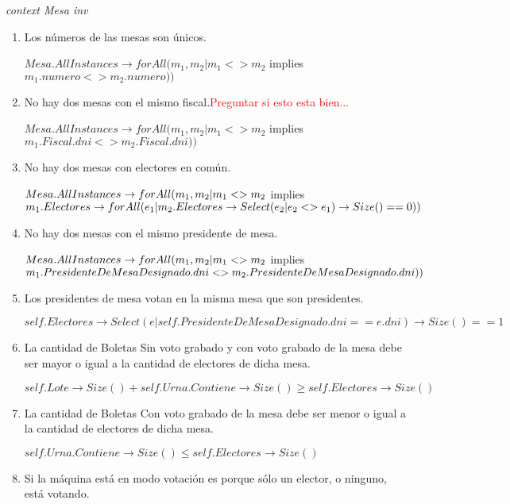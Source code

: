 \textit{context Mesa
inv}
\begin{enumerate}

\item Los n\'umeros de las mesas son únicos.

$Mesa.AllInstances \rightarrow forAll(m_1, m_2 | m_1<>m_2$ implies $m_1.numero <> m_2.numero))$

\item  No hay dos mesas con el mismo fiscal.\textcolor{red}{Preguntar si esto esta bien...}

$Mesa.AllInstances \rightarrow forAll(m_1, m_2 | m_1<>m_2$ implies $m_1.Fiscal.dni <> m_2.Fiscal.dni))$

\item No hay dos mesas con electores en común.

$Mesa.AllInstances \rightarrow \\
 forAll(m_1, m_2 | m_1<>m_2$ implies $m_1.Electores \rightarrow \\
 	forAll(e_1 | m_2.Electores \rightarrow Select(e_2 | e_2 <> e_1) \rightarrow Size() == 0))$

\item No hay dos mesas con el mismo presidente de mesa.

$Mesa.AllInstances \rightarrow \\
forAll(m_1, m_2 | m_1<>m_2$ implies $ \\ m_1.PresidenteDeMesaDesignado.dni <> m_2.PresidenteDeMesaDesignado.dni))$

\item Los presidentes de mesa votan en la misma mesa que son presidentes.

$self.Electores \rightarrow Select(e | self.PresidenteDeMesaDesignado.dni == e.dni) \rightarrow Size() ==1$


\item La cantidad de Boletas Sin voto grabado y con voto grabado de la mesa debe ser mayor o igual a la cantidad de electores de dicha mesa.

$self.Lote \rightarrow Size() + self.Urna.Contiene \rightarrow Size () \geq self.Electores \rightarrow Size()$

\item La cantidad de Boletas Con voto grabado de la mesa debe ser menor o igual a la cantidad de electores de dicha mesa.

$self.Urna.Contiene  \rightarrow  Size() \leq self.Electores \rightarrow Size()$

\item Si la máquina está en modo votación es porque s\'olo un elector, o ninguno, está votando.


\end{enumerate}
